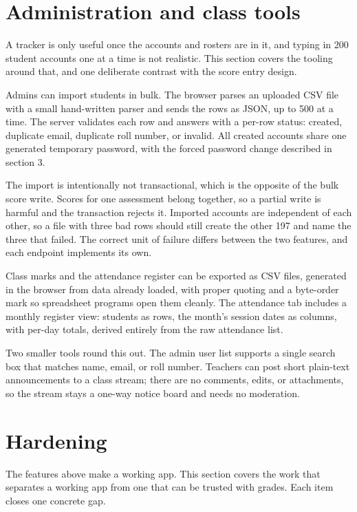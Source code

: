 \documentclass[11pt,a4paper]{article}
\begin{document}
\section{Administration and class tools}

A tracker is only useful once the accounts and rosters are in it, and typing in 200 student accounts one at a time is not realistic. This section covers the tooling around that, and one deliberate contrast with the score entry design.

Admins can import students in bulk. The browser parses an uploaded CSV file with a small hand-written parser and sends the rows as JSON, up to 500 at a time. The server validates each row and answers with a per-row status: created, duplicate email, duplicate roll number, or invalid. All created accounts share one generated temporary password, with the forced password change described in section 3.

The import is intentionally not transactional, which is the opposite of the bulk score write. Scores for one assessment belong together, so a partial write is harmful and the transaction rejects it. Imported accounts are independent of each other, so a file with three bad rows should still create the other 197 and name the three that failed. The correct unit of failure differs between the two features, and each endpoint implements its own.

Class marks and the attendance register can be exported as CSV files, generated in the browser from data already loaded, with proper quoting and a byte-order mark so spreadsheet programs open them cleanly. The attendance tab includes a monthly register view: students as rows, the month's session dates as columns, with per-day totals, derived entirely from the raw attendance list.

Two smaller tools round this out. The admin user list supports a single search box that matches name, email, or roll number. Teachers can post short plain-text announcements to a class stream; there are no comments, edits, or attachments, so the stream stays a one-way notice board and needs no moderation.

\section{Hardening}
\label{sec:hardening}

The features above make a working app. This section covers the work that separates a working app from one that can be trusted with grades. Each item closes one concrete gap.
\end{document}
